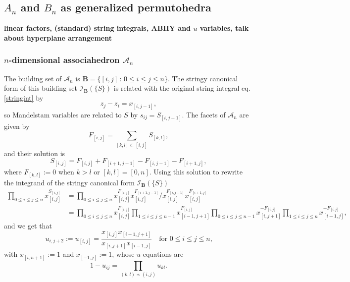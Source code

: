 \documentclass[hidelinks,12pt]{article}
\begin{document}
\subsection{$A_n$ and $B_n$ as generalized permutohedra} 

{\bf linear factors, (standard) string integrals, ABHY and $u$ variables, talk about hyperplane arrangement}

\subsubsection*{$n$-dimensional associahedron $\mathscr A_n$}

The building set of $\mathscr A_n$ is $\mathbf B= \{[i,j]\,:\, 0\leq i\leq j\leq n\}$.
The stringy canonical form of this building set $\mathcal I_{\mathbf B}(\{S\})$
is related with the original string integral eq.\eqref{stringint} by 
\[
	z_{j}-z_i=x_{[i,j-1]},
\]
so Mandelstam variables are related to $S$ by $s_{ij}=S_{[i,j-1]}$.
The facets of $\mathscr A_n$ are given by
\[
	F_{[i,j]}=\sum_{[k,l]\subset [i,j]}S_{[k,l]},
\]
and their solution is 
\begin{equation}\label{Ansf}
S_{[i,j]}=F_{[i,j]}+F_{[i+1,j-1]}-F_{[i,j-1]}-F_{[i+1,j]},
\end{equation}
where $F_{[k,l]}:=0$ when $k>l$ or $[k,l]=[0,n]$. Using this solution to rewrite 
the integrand of the stringy canonical form $\mathcal I_{\mathbf B}(\{S\})$
\begin{align*}
\prod_{0\leq i\leq j\leq n}x_{[i,j]}^{S_{[i,j]}}
&=\prod_{0\leq i\leq j\leq n}x_{[i,j]}^{F_{[i,j]}}x_{[i,j]}^{F_{[i+1,j-1]}}\bigg /
x_{[i,j]}^{F_{[i,j-1]}}x_{[i,j]}^{F_{[i+1,j]}}\\
&=
\prod_{0\leq i\leq j\leq n}x_{[i,j]}^{F_{[i,j]}}
\prod_{1\leq i\leq j\leq n-1}x_{[i-1,j+1]}^{F_{[i,j]}}
\prod_{0\leq i\leq j\leq n-1}x_{[i,j+1]}^{-F_{[i,j]}}
\prod_{1\leq i\leq j\leq n}x_{[i-1,j]}^{-F_{[i,j]}},
\end{align*}
and we get that
\[
u_{i,j+2}:=u_{[i,j]}=\frac{x_{[i,j]}x_{[i-1,j+1]}}{x_{[i,j+1]}x_{[i-1,j]}} \quad \text{for $0\leq i\leq j\leq n$,}
\]
with $x_{[i,n+1]}:=1$ and $x_{[-1,j]}:=1$, whose $u$-equations are
\[
1-u_{ij}=\prod_{(k,l)\not\sim (i,j)}u_{kl}.
\]
\end{document}
